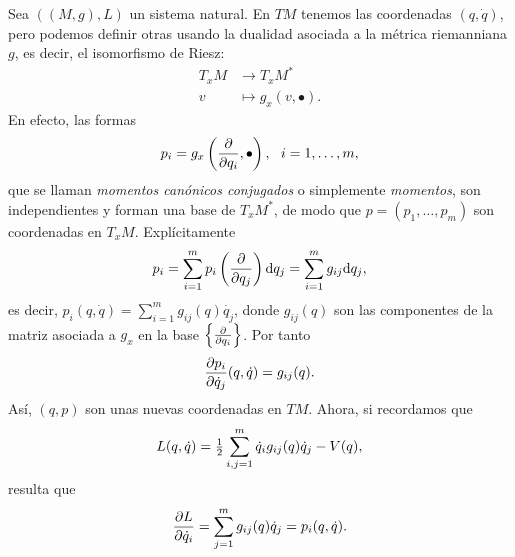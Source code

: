   Sea $\left( (M,g), L \right)$ un sistema natural. En $TM$ tenemos las coordenadas $(q,\dot{q})$, pero podemos definir otras usando la dualidad asociada a la métrica riemanniana $g$, es decir, el isomorfismo de Riesz:
  \begin{align*}
    T_xM & \longrightarrow T_xM^* \\
    v & \longmapsto g_x(v,\bullet).
  \end{align*}
  En efecto, las formas 
  \begin{equation*}
    p_i = g_x\left(\frac{\partial}{\partial q_i},\bullet\right), \ \ i=1,\dots,m,
  \end{equation*}
  que se llaman \emph{momentos canónicos conjugados} o simplemente \emph{momentos}, son independientes y forman una base de $T_xM^*$, de modo que $p=(p_1,\dots,p_m)$ son coordenadas en $T_xM$. Explícitamente
  \begin{equation*}
    p_i= \sum_{i=1}^{m}p_i\left( \frac{\partial}{\partial q_j} \right)\mathrm{d} q_j = \sum_{i=1}^m g_{ij}\mathrm{d} q_j,
  \end{equation*}
  es decir, $p_i(q,\dot{q})=\sum_{i=1}^m g_{ij}(q) \dot{q_j}$, donde $g_{ij}(q)$ son las componentes de la matriz asociada a $g_x$ en la base $\left\lbrace \frac{\partial}{\partial q_i} \right\rbrace$. Por tanto
  \begin{equation*}
    \frac{\partial p_i}{\partial \dot{q}_j}(q,\dot{q})=g_{ij}(q).
  \end{equation*}
  Así, $(q,p)$ son unas nuevas coordenadas en $TM$. Ahora, si recordamos que 
  \begin{equation*}
    L(q,\dot{q})=\tfrac{1}{2}\sum_{i,j=1}^m \dot{q}_i g_{ij}(q) \dot{q}_j - V(q),
  \end{equation*}
  resulta que
  \begin{equation*}
    \frac{\partial L}{\partial \dot{q}_i}=\sum_{j=1}^m g_{ij}(q)\dot{q}_j=p_i(q,\dot{q}).
  \end{equation*}


